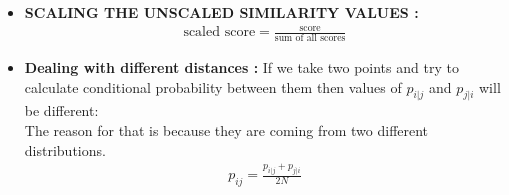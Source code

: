 \documentclass[a4paper, 11pt]{article}
\begin{document}
\begin{itemize}
\begin{itemize}
      \item \textbf{SCALING THE UNSCALED SIMILARITY VALUES :} 
      \begin{align}
        \text{scaled score} = \frac{\text{score}}{\text{sum of all scores}}
      \end{align}
      \item \textbf{Dealing with different distances :} If we take two points and try to calculate conditional probability between them then values of $p_{i|j}$ and $p_{j|i}$ 
       will be different:\\
       The reason for that is because they are coming from two different distributions.
       \begin{align}
        p_{ij} = \frac{p_{i|j} + p_{j|i}}{2N}
      \end{align}
      \end{itemize}


\end{itemize}
\end{document}
